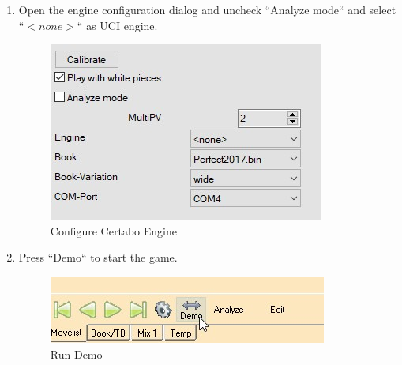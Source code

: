 \documentclass[11pt,a4paper]{article}
\begin{document}
\begin{enumerate}
\begin{figure}[H]
\end{figure}
\item Open the engine configuration dialog and uncheck ``Analyze mode`` and select ``\begin{math} <none> \end{math}`` as UCI engine.
\begin{figure}[H]
	\centering
	\includegraphics[scale=0.8]{Arena_ConfigureCertabo.jpg}
	\caption{Configure Certabo Engine}
	\label{fig:ArenaConfigureCertabo}
\end{figure}
\item Press ``Demo`` to start the game.
\begin{figure}[H]
	\centering
	\includegraphics[scale=0.7]{arena_demo.jpg}
	\caption{Run Demo}
	\label{fig:ArenaDemo}
\end{figure}
\end{enumerate}
\end{document}
